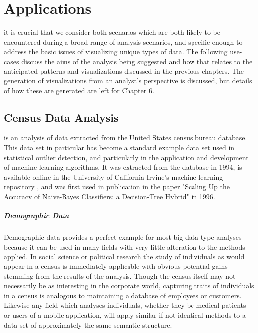 \chapter{Applications}
\label{sec:applications}
 it is crucial that we consider both scenarios which are both likely to be encountered during a broad range of analysis scenarios, and specific enough to address the basic issues of visualizing unique types of data. The following use-cases discuss the aims of the analysis being suggested and how that relates to the anticipated patterns and visualizations discussed in the previous chapters. The generation of visualizations from an analyst's perspective is discussed, but details of how these are generated are left for Chapter 6.

\section{Census Data Analysis}
\label{sec:census}
 is an analysis of data extracted from the United States census bureau database. This data set in particular has become a standard example data set used in statistical outlier detection, and particularly in the application and development of machine learning algorithms. It was extracted from the database in 1994, is available online in the University of California Irvine's machine learning repository \cite{Blake1998}, and was first used in publication in the paper "Scaling Up the Accuracy of Naive-Bayes Classifiers: a Decision-Tree Hybrid"\citep{Kohavi1996} in 1996. 

\paragraph{Demographic Data}
Demographic data provides a perfect example for most big data type analyses because it can be used in many fields with very little alteration to the methods applied. In social science or political research the study of individuals as would appear in a census is immediately applicable with obvious potential gains stemming from the results of the  analysis. Though the census itself may not necessarily be as interesting in the corporate world, capturing traits of individuals in a census is analogous to maintaining a database of employees or customers. Likewise any field which analyses individuals, whether they be medical patients or users of a mobile application, will apply similar if not identical methods to a data set of approximately the same semantic structure. 

